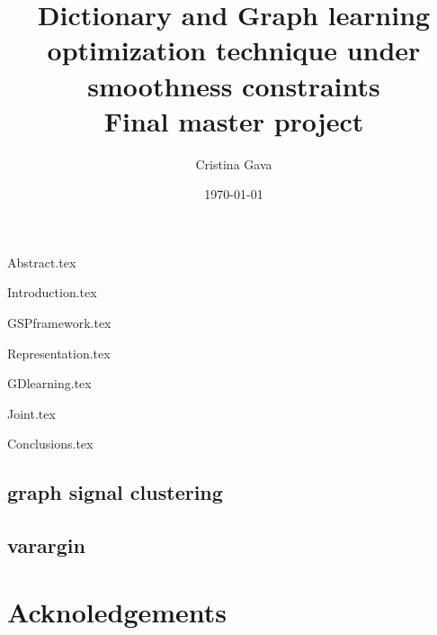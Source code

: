 \documentclass[12pt,a4paper,titlepage]{book}
\title{\blue Dictionary and Graph learning optimization technique under smoothness constraints\\
\blueb Final master project}
\author{Cristina Gava}
\date{\today}
\begin{document}
\maketitle

\tableofcontents

{Abstract.tex}

{Introduction.tex}

{GSPframework.tex}

{Representation.tex}

{GDlearning.tex}

{Joint.tex}

{Conclusions.tex}

%
%
%
%
%
%
%
%
%
%

\section{graph signal clustering}
\section{varargin}

\chapter*{Acknoledgements}



\end{document}
